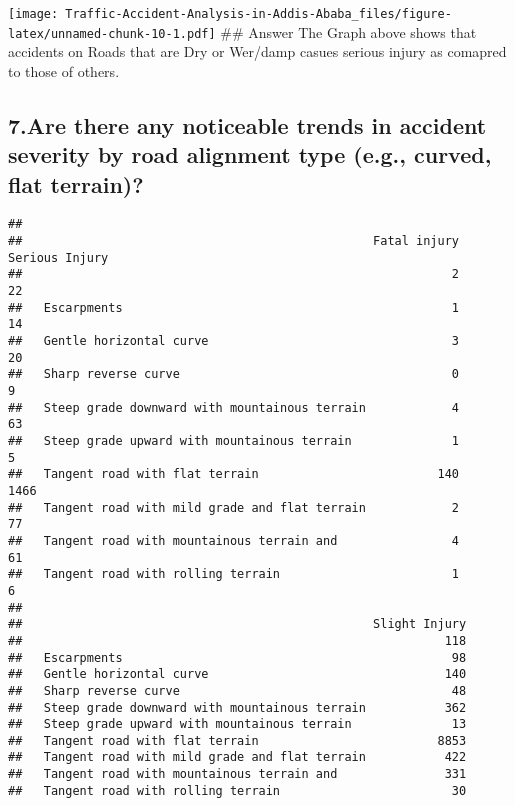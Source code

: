 \documentclass[
]{article}
\newenvironment{Shaded}{\begin{snugshade}}{\end{snugshade}}
\newcommand{\CommentTok}[1]{\textcolor[rgb]{0.56,0.35,0.01}{\textit{#1}}}
\newcommand{\FunctionTok}[1]{\textcolor[rgb]{0.13,0.29,0.53}{\textbf{#1}}}
\newcommand{\NormalTok}[1]{#1}
\newcommand{\OtherTok}[1]{\textcolor[rgb]{0.56,0.35,0.01}{#1}}
\newcommand{\SpecialCharTok}[1]{\textcolor[rgb]{0.81,0.36,0.00}{\textbf{#1}}}
\begin{document}
\texttt{[image: Traffic-Accident-Analysis-in-Addis-Ababa\_files/figure-latex/unnamed-chunk-10-1.pdf]}
\#\# Answer The Graph above shows that accidents on Roads that are Dry
or Wer/damp casues serious injury as comapred to those of others.

\hypertarget{are-there-any-noticeable-trends-in-accident-severity-by-road-alignment-type-e.g.-curved-flat-terrain}{%
\subsection{7.Are there any noticeable trends in accident severity by
road alignment type (e.g., curved, flat
terrain)?}\label{are-there-any-noticeable-trends-in-accident-severity-by-road-alignment-type-e.g.-curved-flat-terrain}}

\begin{Shaded}
\end{Shaded}

\begin{verbatim}
##                                                
##                                                 Fatal injury Serious Injury
##                                                            2             22
##   Escarpments                                              1             14
##   Gentle horizontal curve                                  3             20
##   Sharp reverse curve                                      0              9
##   Steep grade downward with mountainous terrain            4             63
##   Steep grade upward with mountainous terrain              1              5
##   Tangent road with flat terrain                         140           1466
##   Tangent road with mild grade and flat terrain            2             77
##   Tangent road with mountainous terrain and                4             61
##   Tangent road with rolling terrain                        1              6
##                                                
##                                                 Slight Injury
##                                                           118
##   Escarpments                                              98
##   Gentle horizontal curve                                 140
##   Sharp reverse curve                                      48
##   Steep grade downward with mountainous terrain           362
##   Steep grade upward with mountainous terrain              13
##   Tangent road with flat terrain                         8853
##   Tangent road with mild grade and flat terrain           422
##   Tangent road with mountainous terrain and               331
##   Tangent road with rolling terrain                        30
\end{verbatim}
\end{document}
